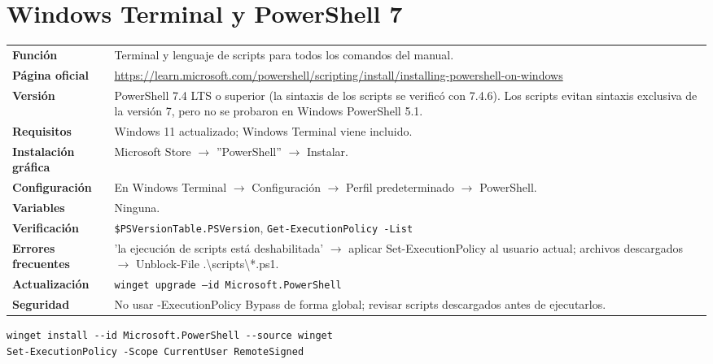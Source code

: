 \section{Windows Terminal y PowerShell 7}
{\small\begin{tabularx}{\linewidth}{@{}>{\bfseries}p{2.9cm}X@{}}\toprule
Función & Terminal y lenguaje de scripts para todos los comandos del manual.\\
Página oficial & \url{https://learn.microsoft.com/powershell/scripting/install/installing-powershell-on-windows}\\
Versión & PowerShell 7.4 LTS o superior (la sintaxis de los scripts se verificó con 7.4.6). Los scripts evitan sintaxis exclusiva de la versión 7, pero no se probaron en Windows PowerShell 5.1.\\
Requisitos & Windows 11 actualizado; Windows Terminal viene incluido.\\
Instalación gráfica & Microsoft Store $\rightarrow$ ''PowerShell'' $\rightarrow$ Instalar.\\
Configuración & En Windows Terminal $\rightarrow$ Configuración $\rightarrow$ Perfil predeterminado $\rightarrow$ PowerShell.\\
Variables & Ninguna.\\
Verificación & \texttt{\$PSVersionTable.PSVersion}, \texttt{Get-ExecutionPolicy -List}\\
Errores frecuentes & 'la ejecución de scripts está deshabilitada' $\rightarrow$ aplicar Set-ExecutionPolicy al usuario actual; archivos descargados $\rightarrow$ Unblock-File .\textbackslash{}scripts\textbackslash{}*.ps1.\\
Actualización & \texttt{winget upgrade --id Microsoft.PowerShell}\\
Seguridad & No usar -ExecutionPolicy Bypass de forma global; revisar scripts descargados antes de ejecutarlos.\\
\bottomrule\end{tabularx}}
\begin{lstlisting}[style=ps]
winget install --id Microsoft.PowerShell --source winget
Set-ExecutionPolicy -Scope CurrentUser RemoteSigned
\end{lstlisting}

